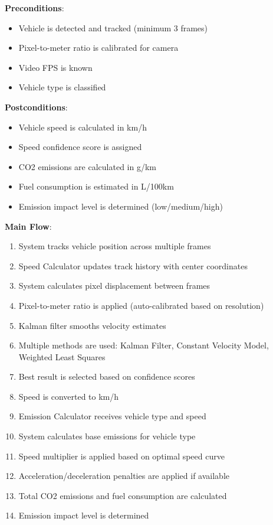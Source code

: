\documentclass[12pt,a4paper]{article}
\begin{document}
\textbf{Preconditions}:
\begin{itemize}
    \item Vehicle is detected and tracked (minimum 3 frames)
    \item Pixel-to-meter ratio is calibrated for camera
    \item Video FPS is known
    \item Vehicle type is classified
\end{itemize}

\textbf{Postconditions}:
\begin{itemize}
    \item Vehicle speed is calculated in km/h
    \item Speed confidence score is assigned
    \item CO2 emissions are calculated in g/km
    \item Fuel consumption is estimated in L/100km
    \item Emission impact level is determined (low/medium/high)
\end{itemize}

\textbf{Main Flow}:
\begin{enumerate}
    \item System tracks vehicle position across multiple frames
    \item Speed Calculator updates track history with center coordinates
    \item System calculates pixel displacement between frames
    \item Pixel-to-meter ratio is applied (auto-calibrated based on resolution)
    \item Kalman filter smooths velocity estimates
    \item Multiple methods are used: Kalman Filter, Constant Velocity Model, Weighted Least Squares
    \item Best result is selected based on confidence scores
    \item Speed is converted to km/h
    \item Emission Calculator receives vehicle type and speed
    \item System calculates base emissions for vehicle type
    \item Speed multiplier is applied based on optimal speed curve
    \item Acceleration/deceleration penalties are applied if available
    \item Total CO2 emissions and fuel consumption are calculated
    \item Emission impact level is determined
\end{enumerate}
\end{document}

